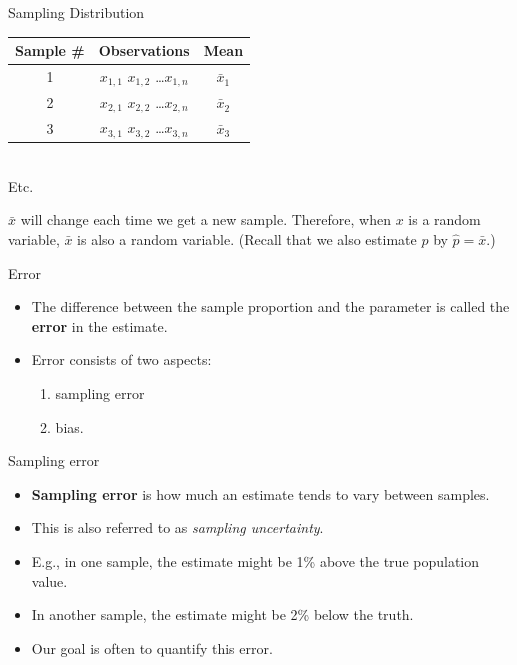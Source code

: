 \begin{frame}{Sampling Distribution}
    \begin{tabular}{c|c|c}
        Sample \# & Observations & Mean  \\
        \hline
        1 & $x_{1,1}$ $x_{1,2}$ \dots $x_{1,n}$ & $\bar{x}_1$ \\
        2 & $x_{2,1}$ $x_{2,2}$ \dots $x_{2,n}$ & $\bar{x}_2$ \\
        3 & $x_{3,1}$ $x_{3,2}$ \dots $x_{3,n}$ & $\bar{x}_3$ \\
    \end{tabular}
    \\ Etc.
    
    \vspace{12pt}$\bar{x}$ will change each time we get a new sample. Therefore, when $x$ is a random variable, $\bar{x}$ is also a random variable. (Recall that we also estimate $p$ by $\hat{p} =\bar{x}$.)
\end{frame}

\begin{frame}{Error}
    \begin{itemize}
        \item The difference between the sample proportion and the parameter is called the \textbf{error} in the estimate. 
        \item Error consists of two aspects: 
        \begin{enumerate}
            \item sampling error 
            \item bias.
        \end{enumerate}
    \end{itemize}
\end{frame}

\begin{frame}{Sampling error}
    \begin{itemize}
        \item \textbf{Sampling error} is how much an estimate tends to vary between samples.
        \item This is also referred to as \textit{sampling uncertainty}.
        \item E.g., in one sample, the estimate might be 1\% above the true population value. 
        \item In another sample, the estimate might be 2\% below the truth. 
        \item Our goal is often to quantify this error. 
    \end{itemize}
\end{frame}

